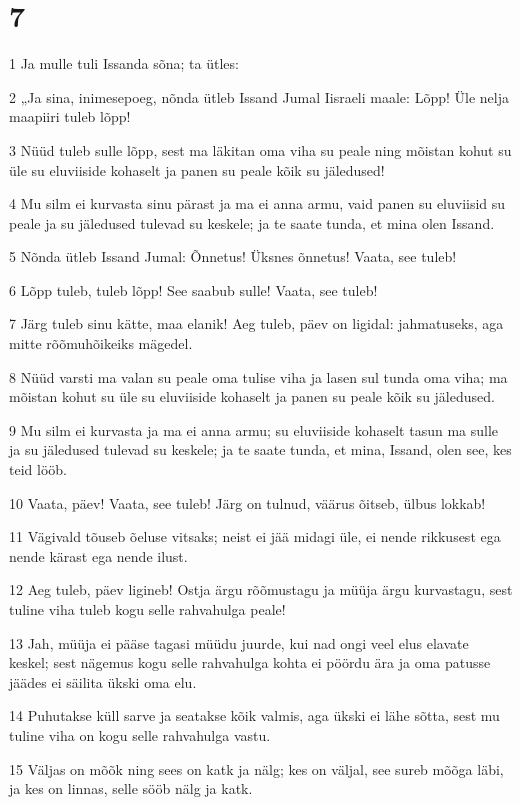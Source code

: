 \chapter{7}

\par 1 Ja mulle tuli Issanda sõna; ta ütles:
\par 2 „Ja sina, inimesepoeg, nõnda ütleb Issand Jumal Iisraeli maale: Lõpp! Üle nelja maapiiri tuleb lõpp!
\par 3 Nüüd tuleb sulle lõpp, sest ma läkitan oma viha su peale ning mõistan kohut su üle su eluviiside kohaselt ja panen su peale kõik su jäledused!
\par 4 Mu silm ei kurvasta sinu pärast ja ma ei anna armu, vaid panen su eluviisid su peale ja su jäledused tulevad su keskele; ja te saate tunda, et mina olen Issand.
\par 5 Nõnda ütleb Issand Jumal: Õnnetus! Üksnes õnnetus! Vaata, see tuleb!
\par 6 Lõpp tuleb, tuleb lõpp! See saabub sulle! Vaata, see tuleb!
\par 7 Järg tuleb sinu kätte, maa elanik! Aeg tuleb, päev on ligidal: jahmatuseks, aga mitte rõõmuhõikeiks mägedel.
\par 8 Nüüd varsti ma valan su peale oma tulise viha ja lasen sul tunda oma viha; ma mõistan kohut su üle su eluviiside kohaselt ja panen su peale kõik su jäledused.
\par 9 Mu silm ei kurvasta ja ma ei anna armu; su eluviiside kohaselt tasun ma sulle ja su jäledused tulevad su keskele; ja te saate tunda, et mina, Issand, olen see, kes teid lööb.
\par 10 Vaata, päev! Vaata, see tuleb! Järg on tulnud, väärus õitseb, ülbus lokkab!
\par 11 Vägivald tõuseb õeluse vitsaks; neist ei jää midagi üle, ei nende rikkusest ega nende kärast ega nende ilust.
\par 12 Aeg tuleb, päev ligineb! Ostja ärgu rõõmustagu ja müüja ärgu kurvastagu, sest tuline viha tuleb kogu selle rahvahulga peale!
\par 13 Jah, müüja ei pääse tagasi müüdu juurde, kui nad ongi veel elus elavate keskel; sest nägemus kogu selle rahvahulga kohta ei pöördu ära ja oma patusse jäädes ei säilita ükski oma elu.
\par 14 Puhutakse küll sarve ja seatakse kõik valmis, aga ükski ei lähe sõtta, sest mu tuline viha on kogu selle rahvahulga vastu.
\par 15 Väljas on mõõk ning sees on katk ja nälg; kes on väljal, see sureb mõõga läbi, ja kes on linnas, selle sööb nälg ja katk.
